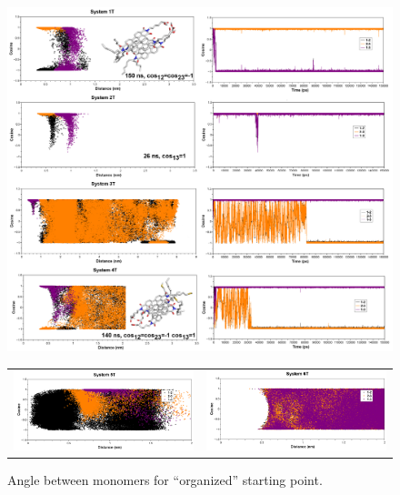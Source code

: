 \begin{figure}[htb]
	\centering
	\includegraphics[width=\columnwidth]{image/Figure10} 
	\begin{tabular}{cc}
		\includegraphics[width=0.5\columnwidth]{image/Figure10b} &
		\includegraphics[width=0.5\columnwidth]{image/Figure10c} \\
	\end{tabular}
	\caption{Angle between monomers for ``organized'' starting point.}
	\label{pap:fig12}
\end{figure}

